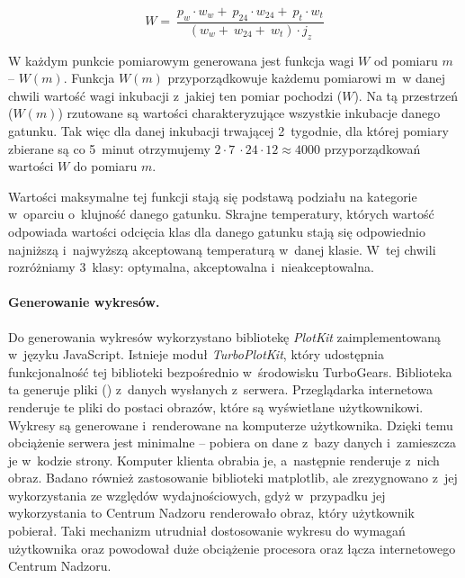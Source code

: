 \begin{equation}
	\label{eq:wagi}
	W =~\frac{p_w \cdot w_w +~p_{24} \cdot w_{24} +~p_t \cdot w_t }{(w_w +~w_{24} +~w_t) \cdot j_z} 
\end{equation}

W każdym punkcie pomiarowym generowana jest funkcja wagi $W$ od pomiaru $m$ -- $W(m)$. 
Funkcja $W(m)$ przyporządkowuje każdemu pomiarowi m~w danej chwili wartość wagi inkubacji z~jakiej ten pomiar pochodzi ($W$).
Na tą przestrzeń ($W(m)$) rzutowane są wartości charakteryzujące wszystkie inkubacje danego gatunku.
Tak więc dla danej inkubacji trwającej 2~tygodnie, dla której pomiary zbierane są co 5~minut otrzymujemy
$2 \cdot 7~\cdot 24 \cdot 12 \approx 4000$ przyporządkowań wartości $W$ do pomiaru $m$.

Wartości maksymalne tej funkcji stają się podstawą podziału na kategorie
w~oparciu o~klujność danego gatunku. Skrajne temperatury, których wartość
odpowiada wartości odcięcia klas dla danego gatunku stają się odpowiednio
najniższą i~najwyższą akceptowaną temperaturą w~danej klasie. W~tej chwili
rozróżniamy 3~klasy: optymalna, akceptowalna i~nieakceptowalna.

\paragraph{Generowanie wykresów.}
Do generowania wykresów wykorzystano bibliotekę \emph{PlotKit} zaimplementowaną
w~języku JavaScript. Istnieje moduł \emph{TurboPlotKit}, który udostępnia
funkcjonalność tej biblioteki bezpośrednio w~środowisku TurboGears. Biblioteka
ta generuje pliki  () z~danych
wysłanych z~serwera. Przeglądarka internetowa renderuje te pliki do postaci
obrazów, które są wyświetlane użytkownikowi. Wykresy są generowane i~renderowane
na komputerze użytkownika. Dzięki temu obciążenie serwera jest minimalne --
pobiera on dane z~bazy danych i~zamieszcza je w~kodzie strony. Komputer klienta
obrabia je, a~następnie renderuje z~nich obraz. Badano również zastosowanie
biblioteki matplotlib, ale zrezygnowano z~jej wykorzystania ze względów
wydajnościowych, gdyż w~przypadku jej wykorzystania to Centrum Nadzoru
renderowało obraz, który użytkownik pobierał. Taki mechanizm utrudniał
dostosowanie wykresu do wymagań użytkownika oraz powodował duże obciążenie
procesora oraz łącza internetowego Centrum Nadzoru. 

